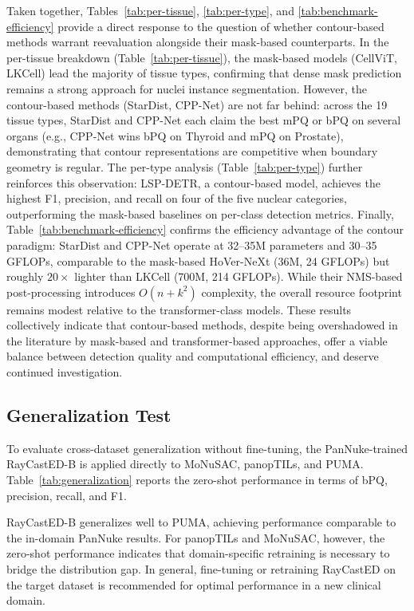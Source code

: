 Taken together, Tables~\ref{tab:per-tissue}, \ref{tab:per-type}, and \ref{tab:benchmark-efficiency} provide a direct response to the question of whether contour-based methods warrant reevaluation alongside their mask-based counterparts. In the per-tissue breakdown (Table~\ref{tab:per-tissue}), the mask-based models (CellViT, LKCell) lead the majority of tissue types, confirming that dense mask prediction remains a strong approach for nuclei instance segmentation. However, the contour-based methods (StarDist, CPP-Net) are not far behind: across the 19 tissue types, StarDist and CPP-Net each claim the best mPQ or bPQ on several organs (e.g., CPP-Net wins bPQ on Thyroid and mPQ on Prostate), demonstrating that contour representations are competitive when boundary geometry is regular. The per-type analysis (Table~\ref{tab:per-type}) further reinforces this observation: LSP-DETR, a contour-based model, achieves the highest F1, precision, and recall on four of the five nuclear categories, outperforming the mask-based baselines on per-class detection metrics. Finally, Table~\ref{tab:benchmark-efficiency} confirms the efficiency advantage of the contour paradigm: StarDist and CPP-Net operate at 32--35M parameters and 30--35 GFLOPs, comparable to the mask-based HoVer-NeXt (36M, 24 GFLOPs) but roughly $20\times$ lighter than LKCell (700M, 214 GFLOPs). While their NMS-based post-processing introduces $O(n+k^2)$ complexity, the overall resource footprint remains modest relative to the transformer-class models. These results collectively indicate that contour-based methods, despite being overshadowed in the literature by mask-based and transformer-based approaches, offer a viable balance between detection quality and computational efficiency, and deserve continued investigation.

\subsection{Generalization Test}
\label{sec:generalization}

To evaluate cross-dataset generalization without fine-tuning, the PanNuke-trained RayCastED-B is applied directly to
MoNuSAC, panopTILs, and PUMA. Table~\ref{tab:generalization} reports the zero-shot performance in terms of
bPQ, precision, recall, and F1.



RayCastED-B generalizes well to PUMA, achieving performance comparable to the in-domain PanNuke results. For panopTILs and MoNuSAC, however, the zero-shot performance indicates that domain-specific retraining is necessary to bridge the distribution gap. In general, fine-tuning or retraining RayCastED on the target dataset is recommended for optimal performance in a new clinical domain.

